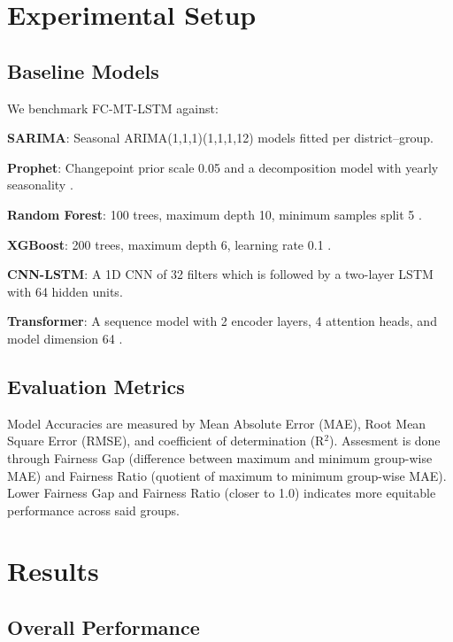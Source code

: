 \documentclass{svproc}
\newcommand{\modelname}{FC-MT-LSTM}
\begin{document}
\section{Experimental Setup}

\subsection{Baseline Models}

We benchmark \modelname{} against:

\textbf{SARIMA}: Seasonal ARIMA(1,1,1)(1,1,1,12) models fitted per district–group.

\textbf{Prophet}: Changepoint prior scale 0.05 and a decomposition model with yearly seasonality \cite{taylor2018forecasting}.

\textbf{Random Forest}: 100 trees, maximum depth 10, minimum samples split 5 \cite{breiman2001random}.

\textbf{XGBoost}: 200 trees, maximum depth 6, learning rate 0.1 \cite{chen2016xgboost}.

\textbf{CNN-LSTM}: A 1D CNN of 32 filters which is followed by a two-layer LSTM with 64 hidden units.

\textbf{Transformer}: A sequence model with 2 encoder layers, 4 attention heads, and model dimension 64 \cite{vaswani2017attention}.

\subsection{Evaluation Metrics}

Model Accuracies are measured by Mean Absolute Error (MAE), Root Mean Square Error (RMSE), and coefficient of determination (R$^2$). Assesment is done through  Fairness Gap (difference between maximum and minimum group-wise MAE) and Fairness Ratio (quotient of maximum to minimum group-wise MAE). Lower Fairness Gap and Fairness Ratio (closer to 1.0) indicates more equitable performance across said groups.

\section{Results}

\subsection{Overall Performance}
\end{document}
